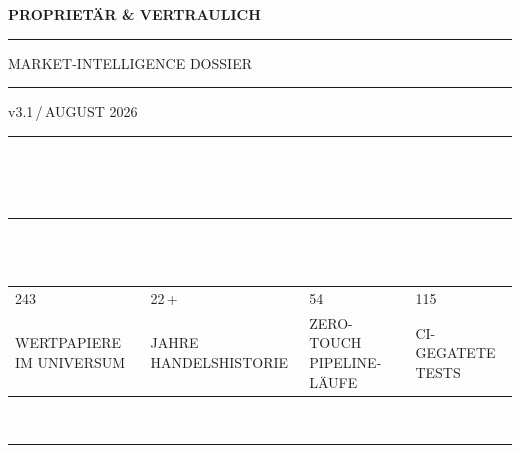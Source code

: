 \documentclass[11pt, a4paper, oneside, openany]{report}
\begin{document}
\begin{titlepage}
\pagestyle{empty}

\noindent\textcolor{N700}{\sffamily\fontsize{7.5}{9}\selectfont\bfseries
PROPRIETÄR \& VERTRAULICH \quad\textcolor{SwissRed}{\rule[0.5ex]{8pt}{1pt}}\quad
MARKET-INTELLIGENCE DOSSIER \quad\textcolor{SwissRed}{\rule[0.5ex]{8pt}{1pt}}\quad
v3.1\,/\,AUGUST 2026}
\vspace{3mm}
\noindent\textcolor{N300}{\rule{\textwidth}{0.4pt}}

\vspace{18mm}

\\[2pt]

\vspace{28mm}

\\[4mm]

\vspace{14mm}

\noindent\textcolor{N300}{\rule{\textwidth}{0.4pt}}\\[1mm]
\\[3mm]
\noindent\begin{tabular*}{\textwidth}{@{\extracolsep{\fill}}llll@{}}
{\datafont\fontsize{26}{30}\selectfont\color{DeepNavy}243} &
{\datafont\fontsize{26}{30}\selectfont\color{DeepNavy}22\,+} &
{\datafont\fontsize{26}{30}\selectfont\color{DeepNavy}54} &
{\datafont\fontsize{26}{30}\selectfont\color{DeepNavy}115} \\[1mm]
{\sffamily\fontsize{7}{9}\selectfont\color{N700}\MakeUppercase{Wertpapiere im Universum}} &
{\sffamily\fontsize{7}{9}\selectfont\color{N700}\MakeUppercase{Jahre Handelshistorie}} &
{\sffamily\fontsize{7}{9}\selectfont\color{N700}\MakeUppercase{Zero-Touch Pipeline-Läufe}} &
{\sffamily\fontsize{7}{9}\selectfont\color{N700}\MakeUppercase{CI-gegatete Tests}} \\
\end{tabular*}\\[2mm]
\noindent\textcolor{N300}{\rule{\textwidth}{0.4pt}}


\end{titlepage}
\end{document}
